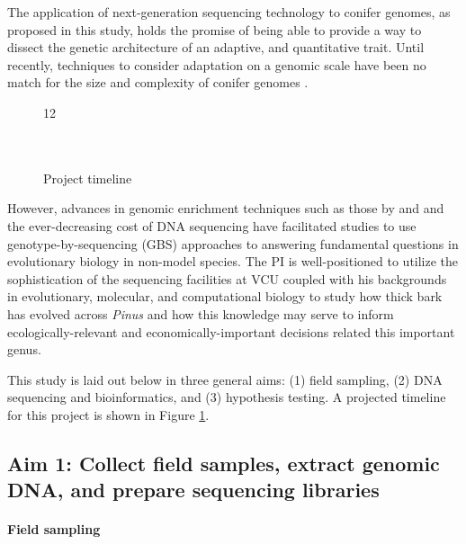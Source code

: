 The application of next-generation sequencing technology to conifer genomes, as proposed in this study, holds the promise of 
being able to provide a way to dissect the genetic architecture of an adaptive, and quantitative trait.  Until recently, techniques 
to consider adaptation on a genomic scale have been no match for the size and complexity of conifer genomes \citep{Mackay:2012hr}.  
\begin{figure}
	\begin{ganttchart}[vgrid,
	bar/.style={fill=gray!40}, 
	title/.style={fill=gray!10}]{12}
	\\
	\\
	\\
	\end{ganttchart}
\caption{Project timeline}
\vspace{-10pt}
\label{f:timeline}
\end{figure}
However, advances in genomic enrichment techniques such as those by \citet{Parchman:2012ca} and \citet{Willing:2011jb} and 
the ever-decreasing cost of DNA sequencing have facilitated studies to use genotype-by-sequencing (GBS) approaches to 
answering fundamental questions in evolutionary biology in non-model species.  The PI is well-positioned to utilize the 
sophistication of the sequencing facilities at VCU coupled with his backgrounds in evolutionary, molecular, and 
computational biology to study how thick bark has evolved across \emph{Pinus} and how this knowledge may serve to 
inform ecologically-relevant and economically-important decisions related this important genus.

This study is laid out below in three general aims: (1) field sampling, (2) DNA sequencing and bioinformatics, and (3) 
hypothesis testing.  A projected timeline for this project is shown in Figure \ref{f:timeline}.

\subsection*{Aim 1: Collect field samples, extract genomic DNA, and prepare sequencing libraries}

\paragraph{Field sampling}

